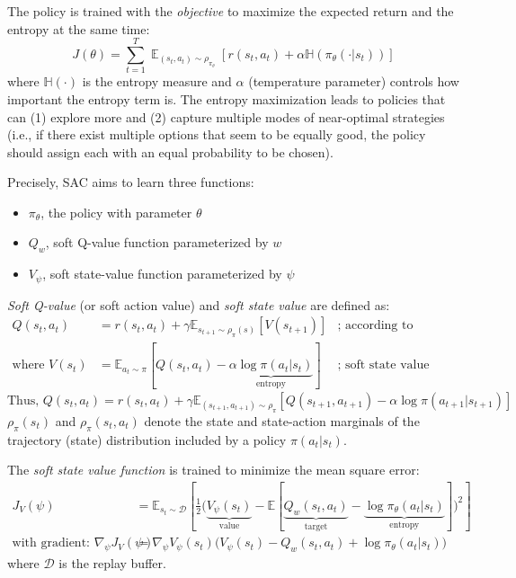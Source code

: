 \documentclass[lang=en,mode=normal,device=normal,color=blue,12pt]{elegantnote}
\DeclareMathOperator*{\1}{\mathbbm{1}}
\DeclareMathOperator*{\E}{\mathbb{E}}
\begin{document}
The policy is trained with the \textit{objective} to maximize the expected return and the entropy at the same time:
\[
J(\theta) = \sum_{t=1}^T \E_{(s_t, a_t) \sim \rho_{\pi_\theta}} [r(s_t, a_t) + \alpha \mathbb{H} (\pi_\theta(\cdot | s_t))]
\]
where $\mathbb{H}(\cdot)$ is the entropy measure and $\alpha$ (temperature parameter) controls how important the entropy term is.
The entropy maximization leads to policies that can (1) explore more and (2) capture multiple modes of near-optimal strategies (i.e., if there exist multiple options that seem to be equally good, the policy should assign each with an equal probability to be chosen).

Precisely, SAC aims to learn three functions:

\begin{itemize}
\item $\pi_\theta$, the policy with parameter $\theta$
\item $Q_w$, soft Q-value function parameterized by $w$
\item $V_\psi$, soft state-value function parameterized by $\psi$
\end{itemize}

\textit{Soft Q-value} (or soft action value) and \textit{soft state value} are defined as:
\begin{align*}
Q(s_t, a_t) &= r(s_t, a_t) + \gamma \mathbb{E}_{s_{t+1} \sim \rho_{\pi}(s)} [V(s_{t+1})] & \text{; according to Bellman equation.}\\
\text{where }V(s_t) &= \mathbb{E}_{a_t \sim \pi} [Q(s_t, a_t) - \underbrace{\alpha \log \pi(a_t | s_t)}_\text{entropy}] & \text{; soft state value function.}
\end{align*}
\[
\text{Thus, } Q(s_t, a_t) = r(s_t, a_t) + \gamma \mathbb{E}_{(s_{t+1}, a_{t+1}) \sim \rho_{\pi}} [Q(s_{t+1}, a_{t+1}) - \alpha \log \pi(a_{t+1} \vert s_{t+1})]
\]
$\rho_\pi (s_t)$ and $\rho_\pi(s_t, a_t)$ denote the state and state-action marginals of the trajectory (state) distribution included by a policy $\pi (a_t |s_t)$.

The \textit{soft state value function} is trained to minimize the mean square error:
\begin{align*}
J_V(\psi) &= \mathbb{E}_{s_t \sim \mathcal{D}} [\frac{1}{2} \big( \underbrace{V_\psi(s_t)}_\text{value} - \mathbb{E}[\underbrace{Q_w(s_t, a_t)}_\text{target} - \underbrace{\log \pi_\theta(a_t \vert s_t)}_\text{entropy}] \big)^2] \\
\text{with gradient: }\nabla_\psi J_V(\psi) &= \nabla_\psi V_\psi(s_t)\big( V_\psi(s_t) - Q_w(s_t, a_t) + \log \pi_\theta (a_t \vert s_t) \big)
\end{align*}
where $\mathcal{D}$ is the replay buffer.
\end{document}
